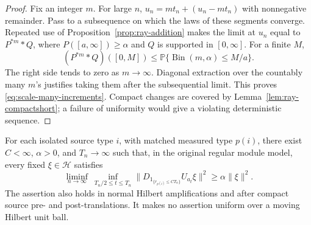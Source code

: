 \begin{proof}
Fix an integer \(m\).  For large \(n\),
\(u_n=mt_n+(u_n-mt_n)\) with nonnegative remainder.
Pass to a subsequence on which the laws of these
segments converge.  Repeated use of
Proposition~\ref{prop:ray-addition} makes the limit at
\(u_n\) equal to \(P^{*m}*Q\), where
\(P([a,\infty])\ge\alpha\) and \(Q\) is supported in
\([0,\infty]\).  For a finite \(M\),
\begin{equation}
 (P^{*m}*Q)([0,M])
 \le \mathbb P\{\operatorname{Bin}(m,\alpha)\le M/a\}.
 \label{eq:scale-binomial}
\end{equation}
The right side tends to zero as \(m\to\infty\).
Diagonal extraction over the countably many \(m\)'s
justifies taking them after the subsequential limit.
This proves \eqref{eq:scale-many-increments}.
Compact changes are covered by
Lemma~\ref{lem:ray-compactshort}; a failure of uniformity
would give a violating deterministic sequence.
\end{proof}

\begin{proposition}\label{prop:scale-linear-subsequence}
For each isolated source type \(i\), with matched measured
type \(p(i)\), there exist \(C<\infty\), \(\alpha>0\), and
\(T_n\to\infty\) such that, in the original regular module
model, every fixed \(\xi\in\mathcal H\) satisfies
\begin{equation}\label{eq:scale-linear-subsequence}
 \liminf_{n\to\infty}\ \inf_{T_n/2\le t\le T_n}
 \bigl\|D_{1_{\{r_{p(i)}\le CT_n\}}}U_{a_t}\xi\bigr\|^2
 \ge\alpha\|\xi\|^2 .
\end{equation}
The assertion also holds in normal Hilbert amplifications
and after compact source pre- and post-translations.
It makes no assertion uniform over a moving Hilbert unit
ball.
\end{proposition}

